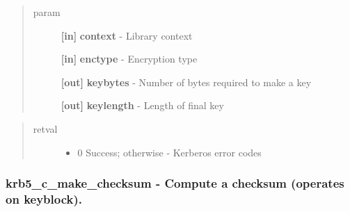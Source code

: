 \documentclass[letterpaper,10pt,english]{sphinxmanual}
\begin{document}
\begin{quote}\begin{description}
\item[{param}] \leavevmode
\textbf{{[}in{]}} \textbf{context} - Library context

\textbf{{[}in{]}} \textbf{enctype} - Encryption type

\textbf{{[}out{]}} \textbf{keybytes} - Number of bytes required to make a key

\textbf{{[}out{]}} \textbf{keylength} - Length of final key

\end{description}\end{quote}
\begin{quote}\begin{description}
\item[{retval}] \leavevmode\begin{itemize}
\item {} 
0   Success; otherwise - Kerberos error codes

\end{itemize}

\end{description}\end{quote}


\subsubsection{krb5\_c\_make\_checksum -  Compute a checksum (operates on keyblock).}
\label{appdev/refs/api/krb5_c_make_checksum::doc}\label{appdev/refs/api/krb5_c_make_checksum:krb5-c-make-checksum-compute-a-checksum-operates-on-keyblock}

\begin{fulllineitems}
\label{appdev/refs/api/krb5_c_make_checksum:c.krb5_c_make_checksum}
\end{fulllineitems}
\end{document}
